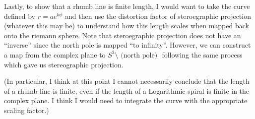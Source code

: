 \documentclass[12pt,letterpaper,boxed]{hmcpset}
\begin{document}
\begin{solution}
Lastly, to show that a rhumb line is finite length, I would want to
take the curve defined by $r = a e^{k \phi}$ and then use the distortion factor of
steroegraphic projection (whatever this may be) to understand how this length scales when
mapped back onto the riemann sphere. Note that steroegraphic
projection does not have an ``inverse'' since the north pole is mapped
``to infinity''. However, we can construct a map from the complex
plane to $S^2 \setminus \text{ (north pole) }$ following the same
process which gave us stereographic projection. 

(In particular, I
think at this point I cannot necessarily conclude that the length of a
rhumb line is finite, even if the length of a Logarithmic spiral is
finite in the complex plane. I think I would need to integrate the curve with the appropriate
scaling factor.)





\end{solution}

\newpage

\end{document}

